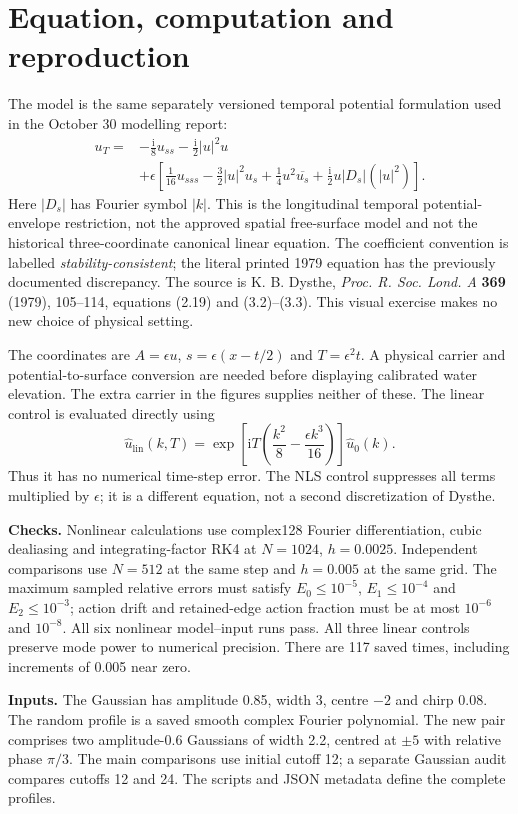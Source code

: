 \documentclass[11pt]{article}
\begin{document}
\section*{Equation, computation and reproduction}
The model is the same separately versioned temporal potential formulation used in the October 30 modelling report:
\begin{align*}
 u_T={}&-\frac{\mathrm{i}}8u_{ss}-\frac{\mathrm{i}}2|u|^2u\\
 &+\epsilon\left[\frac1{16}u_{sss}-\frac32|u|^2u_s
 +\frac14u^2\overline{u_s}+\frac{\mathrm{i}}2u|D_s|(|u|^2)\right].
\end{align*}
Here $|D_s|$ has Fourier symbol $|k|$. This is the longitudinal temporal potential-envelope restriction, not the approved spatial free-surface model and not the historical three-coordinate canonical linear equation. The coefficient convention is labelled \emph{stability-consistent}; the literal printed 1979 equation has the previously documented discrepancy. The source is K. B. Dysthe, \emph{Proc. R. Soc. Lond. A} \textbf{369} (1979), 105--114, equations (2.19) and (3.2)--(3.3). This visual exercise makes no new choice of physical setting.

The coordinates are $A=\epsilon u$, $s=\epsilon(x-t/2)$ and $T=\epsilon^2t$. A physical carrier and potential-to-surface conversion are needed before displaying calibrated water elevation. The extra carrier in the figures supplies neither of these. The linear control is evaluated directly using
\[
 \widehat u_{\mathrm{lin}}(k,T)
 =\exp\!\left[\mathrm{i}T\left(\frac{k^2}{8}-\frac{\epsilon k^3}{16}\right)\right]\widehat u_0(k).
\]
Thus it has no numerical time-step error. The NLS control suppresses all terms multiplied by $\epsilon$; it is a different equation, not a second discretization of Dysthe.

\textbf{Checks.} Nonlinear calculations use complex128 Fourier differentiation, cubic dealiasing and integrating-factor RK4 at $N=1024$, $h=0.0025$. Independent comparisons use $N=512$ at the same step and $h=0.005$ at the same grid. The maximum sampled relative errors must satisfy $E_0\le10^{-5}$, $E_1\le10^{-4}$ and $E_2\le10^{-3}$; action drift and retained-edge action fraction must be at most $10^{-6}$ and $10^{-8}$. All six nonlinear model--input runs pass. All three linear controls preserve mode power to numerical precision. There are 117 saved times, including increments of 0.005 near zero.

\textbf{Inputs.} The Gaussian has amplitude 0.85, width 3, centre $-2$ and chirp 0.08. The random profile is a saved smooth complex Fourier polynomial. The new pair comprises two amplitude-0.6 Gaussians of width 2.2, centred at $\pm5$ with relative phase $\pi/3$. The main comparisons use initial cutoff 12; a separate Gaussian audit compares cutoffs 12 and 24. The scripts and JSON metadata define the complete profiles.
\end{document}
